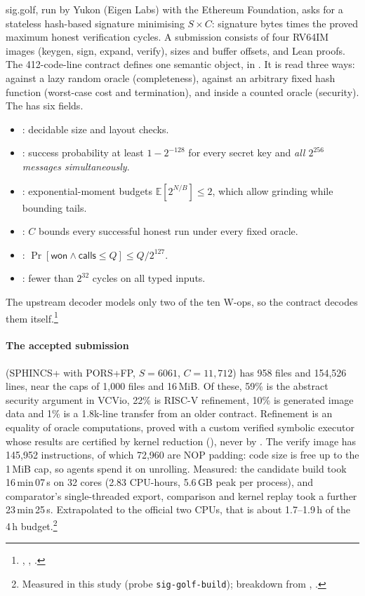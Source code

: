 sig.golf, run by Yukon (Eigen Labs) with the Ethereum Foundation, asks for a stateless hash-based
signature minimising $S\times C$: signature bytes times the proved maximum honest verification
cycles. A submission consists of four RV64IM images (keygen, sign, expand, verify), sizes and
buffer offsets, and Lean proofs. The 412-code-line contract defines one semantic object,
 in . It is read three ways: against a lazy random oracle
(completeness), against an arbitrary fixed hash function (worst-case cost and termination), and
inside a counted oracle (security). The  has six fields.
\begin{itemize}[nosep]
\item {}: decidable size and layout checks.
\item {}: success probability at least $1-2^{-128}$ for every secret key and
  \emph{all $2^{256}$ messages simultaneously}.
\item {}: exponential-moment budgets
  $\mathbb{E}[2^{N/B}]\le2$, which allow grinding while bounding tails.
\item {}: $C$ bounds every successful honest run under every fixed oracle.
\item {}: $\Pr[\mathsf{won}\wedge\mathsf{calls}\le Q]\le Q/2^{127}$.
\item {}: fewer than $2^{32}$ cycles on all typed inputs.
\end{itemize}
The upstream decoder models only two of the ten W-ops, so the contract decodes them itself.\footnote{,
, .}

\paragraph{The accepted submission} (SPHINCS+ with PORS+FP, $S=6061$, $C=11{,}712$) has 958 files
and 154{,}526 lines, near the caps of 1{,}000 files and 16\,MiB. Of these, 59\% is the abstract
security argument in VCVio, 22\% is RISC-V refinement, 10\% is generated image data and 1\% is a
1.8k-line transfer from an older contract. Refinement is an equality of oracle computations,
proved with a custom verified symbolic executor whose results are certified by kernel reduction
(), never by . The verify image has 145{,}952 instructions, of
which 72{,}960 are NOP padding: code size is free up to the 1\,MiB cap, so agents spend it on
unrolling. Measured: the candidate build took 16\,min\,07\,s on 32 cores (2.83 CPU-hours, 5.6\,GB
peak per process), and comparator's single-threaded export, comparison and kernel replay took a
further 23\,min\,25\,s. Extrapolated to the official two CPUs, that is about 1.7--1.9\,h of the
4\,h budget.\footnote{Measured in this study (probe \texttt{sig-golf-build}); breakdown from
, .}

